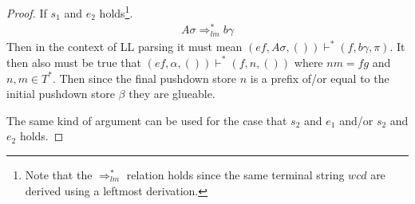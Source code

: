 \begin{proof}
    If $s_1$ and $e_2$ holds\footnote{Note that the $\Rightarrow^*_{lm}$ relation holds since the same terminal string $wcd$ are derived using a leftmost derivation.}.
    \begin{align*}
        A\sigma \Rightarrow^*_{lm} b\gamma 
    \end{align*}
    Then in the context of LL parsing it must mean $(ef, A\sigma, ()) \vdash^* (f, b\gamma, \pi)$. It then also must be true that $(ef, \alpha, ()) \vdash^* (f, n, ())$ where $nm = fg$ and $n, m \in T^*$. Then since the final pushdown store $n$ is a prefix of/or equal to the initial pushdown store $\beta$ they are glueable.
    
    The same kind of argument can be used for the case that $s_2$ and $e_1$ and/or $s_2$ and $e_2$ holds.
\end{proof}